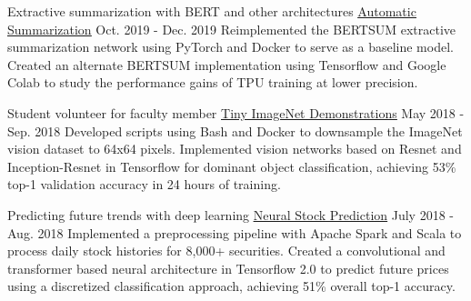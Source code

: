 

\begin{cventries}

  \cventry
  	{Extractive summarization with BERT and other architectures} %
		{
			\href{https://github.com/TidalPaladin/neural-summarizer}
      {\underline{Automatic Summarization}}
		} %
  	{Oct. 2019 - Dec. 2019} %
    {} %
	{
		Reimplemented the BERTSUM extractive summarization network using
		PyTorch and Docker to serve as a baseline model. Created an
		alternate BERTSUM implementation using Tensorflow and Google Colab
		to study the performance gains of TPU training at lower precision.
	}

  \cventry
  	{Student volunteer for faculty member} %
		{
			\href{https://github.com/TidalPaladin/tiny-imagenet-demo}
      {\underline{Tiny ImageNet Demonstrations}}
		} %
  	{May 2018 - Sep. 2018} %
    {} %
	{
		Developed scripts using Bash and Docker to downsample
		the ImageNet vision dataset to 64x64 pixels.
		Implemented vision networks based on Resnet and
		Inception-Resnet in Tensorflow for dominant object
		classification, achieving 53\% top-1 validation accuracy
		in 24 hours of training.
	}

  \cventry
  	{Predicting future trends with deep learning} %
		{
			\href{https://github.com/TidalPaladin/trader}
      {\underline{Neural Stock Prediction}}
		} %
  	{July 2018 - Aug. 2018} %
    {} %
	{
		Implemented a preprocessing pipeline with Apache Spark and Scala
		to process daily stock histories for 8,000+ securities.
		Created a convolutional and transformer based neural architecture
		in Tensorflow 2.0 to predict future prices using a discretized
		classification approach, achieving 51\% overall top-1 accuracy.
	}

\end{cventries}
